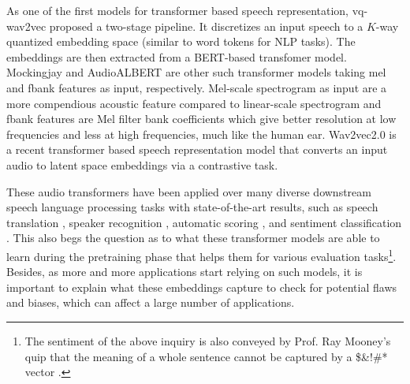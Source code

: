 \documentclass[sigconf]{acmart}
\begin{document}
As one of the first models for transformer based speech representation, vq-wav2vec \cite{baevski2019vq} proposed a two-stage pipeline. It discretizes an input speech to a $K$-way quantized embedding space (similar to word tokens for NLP tasks). The embeddings are then extracted from a BERT-based transfomer model. 
Mockingjay \cite{liu2020Mockingjay} and AudioALBERT \cite{chi2020audio} are other such transformer models taking mel and fbank features as input, respectively. Mel-scale spectrogram as input are a more compendious acoustic feature compared to linear-scale spectrogram and fbank features are Mel filter bank coefficients which give better resolution at low frequencies and less at high frequencies, much like the human ear.
Wav2vec2.0 \cite{baevski2020wav2vec} is a recent transformer based speech representation model that converts an input audio to latent space embeddings via a contrastive task. %


These audio transformers have been applied over many diverse downstream speech language processing tasks with state-of-the-art results, such as speech translation \cite{wu2020self}, speaker recognition \cite{tian2020synchronous}, automatic scoring \cite{grover2020multi}, and sentiment classification \cite{tang2020dependency}. %
This also begs the question as to what these transformer models are able to learn during the pretraining phase that helps them for various evaluation tasks\footnote{The sentiment of the above inquiry is also conveyed by Prof. Ray Mooney's quip that the meaning of a whole sentence cannot be captured by a \$\&!\#* vector \cite{conneau2018you,mooneyQuip}.}. %
Besides, as more and more applications start relying on such models, it is important to explain what these embeddings capture to check for potential flaws and biases, which can affect a large number of applications. 
\end{document}
